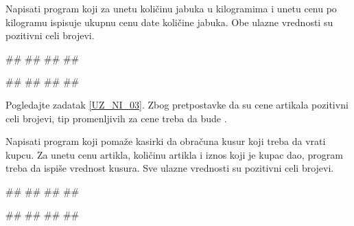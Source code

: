 \begin{Exercise}[label=UZ_NI_05]
Napisati program koji za unetu količinu jabuka u kilogramima i unetu
cenu po kilogramu ispisuje ukupnu cenu date količine jabuka. 
Obe ulazne vrednosti su pozitivni celi brojevi.

\begin{miditest}
\begin{upotreba}{1}
#\naslovInt#
##
##
##
\end{upotreba}
\end{miditest}
\begin{miditest}
\begin{upotreba}{1}
#\naslovInt#
##
##
##
\end{upotreba}
\end{miditest}
\end{Exercise}
\ifresenja
\begin{Answer}[ref=UZ_NI_05]
Pogledajte zadatak \ref{UZ_NI_03}. Zbog pretpostavke da su cene artikala pozitivni celi brojevi, 
tip promenljivih za cene treba da bude .
\end{Answer}
\fi


\begin{Exercise}[label=UZ_NI_06] 
Napisati program koji pomaže kasirki da obračuna kusur koji treba da vrati kupcu. 
Za unetu cenu artikla, količinu artikla i iznos koji je kupac dao, program treba da 
ispiše vrednost kusura. Sve ulazne vrednosti su pozitivni celi brojevi. 

\begin{miditest}
\begin{upotreba}{1}
#\naslovInt#
##
##
##
\end{upotreba}
\end{miditest}
\begin{miditest}
\begin{upotreba}{2}
#\naslovInt#
##
##
##
\end{upotreba}
\end{miditest}

\end{Exercise}
\ifresenja
\begin{Answer}[ref=UZ_NI_06]
\end{Answer}
\fi


